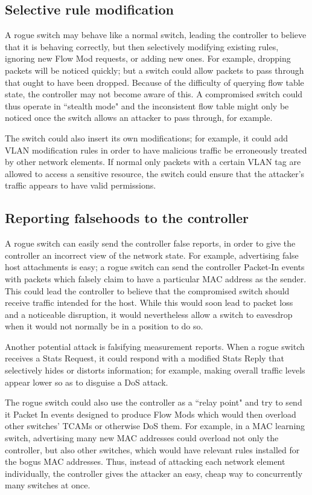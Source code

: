 \subsection{Selective rule modification}
A rogue switch may behave like a normal switch, leading the controller to believe that it is behaving correctly, but then selectively modifying existing rules, ignoring new Flow Mod requests, or adding new ones. For example, dropping packets will be noticed quickly; but a switch could allow packets to pass through that ought to have been dropped. Because of the difficulty of querying flow table state, the controller may not become aware of this. A compromised switch could thus operate in ``stealth mode" and the inconsistent flow table might only be noticed once the switch allows an attacker to pass through, for example.

The switch could also insert its own modifications; for example, it could add VLAN modification rules in order to have malicious traffic be erroneously treated by other network elements. If normal only packets with a certain VLAN tag are allowed to access a sensitive resource, the switch could ensure that the attacker's traffic appears to have valid permissions.

\subsection{Reporting falsehoods to the controller}

A rogue switch can easily send the controller false reports, in order to give the controller an incorrect view of the network state. For example, advertising false host attachments is easy; a rogue switch can send the controller Packet-In events with packets which falsely claim to have a particular MAC address as the sender. This could lead the controller to believe that the compromised switch should receive traffic intended for the host. While this would soon lead to packet loss and a noticeable disruption, it would nevertheless allow a switch to eavesdrop when it would not normally be in a position to do so.

Another potential attack is falsifying measurement reports. When a rogue switch receives a Stats Request, it could respond with a modified Stats Reply that selectively hides or distorts information; for example, making overall traffic levels appear lower so as to disguise a DoS attack. 

The rogue switch could also use the controller as a ``relay point" and try to send it Packet In events designed to produce Flow Mods which would then overload other switches' TCAMs or otherwise DoS them. For example, in a MAC learning switch, advertising many new MAC addresses could overload not only the controller, but also other switches, which would have relevant rules installed for the bogus MAC addresses. Thus, instead of attacking each network element individually, the controller gives the attacker an easy, cheap way to concurrently many switches at once. 

